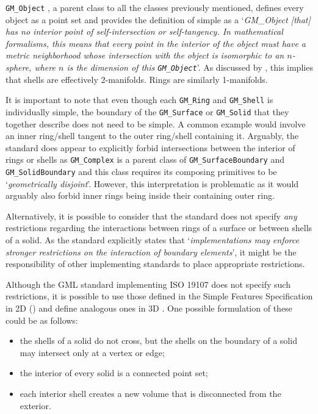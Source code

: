 \texttt{GM\_Object} \citep[\S{}6.2.2]{ISO19107:2005}, a parent class to all the classes previously mentioned, defines every object as a point set and provides the definition of simple as a `\emph{GM\_Object [that] has no interior point of self-intersection or self-tangency.
In mathematical formalisms, this means that every point in the interior of the object must have a metric neighborhood whose intersection with the object is isomorphic to an $n$-sphere, where $n$ is the dimension of this \texttt{GM\_Object}}'.
As discussed by \citet{Ledoux13}, this implies that shells are effectively 2-manifolds.
Rings are similarly 1-manifolds.

It is important to note that even though each \texttt{GM\_Ring} and \texttt{GM\_Shell} is individually simple, the boundary of the \texttt{GM\_Surface} or \texttt{GM\_Solid} that they together describe does not need to be simple.
A common example would involve an inner ring/shell tangent to the outer ring/shell containing it.
Arguably, the standard does appear to explicitly forbid intersections between the interior of rings or shells as \texttt{GM\_Complex} is a parent class of \texttt{GM\_SurfaceBoundary} and \texttt{GM\_SolidBoundary} and this class requires its composing primitives to be `\emph{geometrically disjoint}'.
However, this interpretation is problematic as it would arguably also forbid inner rings being inside their containing outer ring.

Alternatively, it is possible to consider that the standard does not specify \emph{any} restrictions regarding the interactions between rings of a surface or between shells of a solid.
As the standard explicitly states that `\emph{implementations may enforce stronger restrictions on the interaction of boundary elements}', it might be the responsibility of other implementing standards to place appropriate restrictions.

Although the GML standard \citep{GML3.2.1} implementing ISO 19107 does not specify such restrictions, it is possible to use those defined in the Simple Features Specification in 2D () and define analogous ones in 3D \citep{Ledoux13}.
One possible formulation of these could be as follows:

\begin{itemize}
\item the shells of a solid do not cross, but the shells on the boundary of a solid may intersect only at a vertex or edge;
\item the interior of every solid is a connected point set;
\item each interior shell creates a new volume that is disconnected from the exterior.
\end{itemize}

